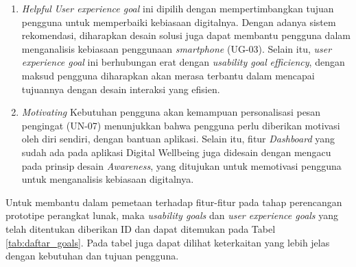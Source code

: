 \begin{enumerate}
  \item \textit{Helpful}
  \subitem \textit{User experience goal} ini dipilih dengan mempertimbangkan tujuan pengguna untuk memperbaiki kebiasaan digitalnya. Dengan adanya sistem rekomendasi, diharapkan desain solusi juga dapat membantu pengguna dalam menganalisis kebiasaan penggunaan \textit{smartphone} (UG-03). Selain itu, \textit{user experience goal} ini berhubungan erat dengan \textit{usability goal} \textit{efficiency}, dengan maksud pengguna diharapkan akan merasa terbantu dalam mencapai tujuannya dengan desain interaksi yang efisien.

  \item \textit{Motivating}
  \subitem Kebutuhan pengguna akan kemampuan personalisasi pesan pengingat (UN-07) menunjukkan bahwa pengguna perlu diberikan motivasi oleh diri sendiri, dengan bantuan aplikasi. Selain itu, fitur \textit{Dashboard} yang sudah ada pada aplikasi Digital Wellbeing juga didesain dengan mengacu pada prinsip desain \textit{Awareness}, yang ditujukan untuk memotivasi pengguna untuk menganalisis kebiasaan digitalnya.

\end{enumerate}

Untuk membantu dalam pemetaan terhadap fitur-fitur pada tahap perencangan prototipe perangkat lunak, maka \textit{usability goals} dan \textit{user experience goals} yang telah ditentukan diberikan ID dan dapat ditemukan pada Tabel \ref{tab:daftar_goals}. Pada tabel juga dapat dilihat keterkaitan yang lebih jelas dengan kebutuhan dan tujuan pengguna.

